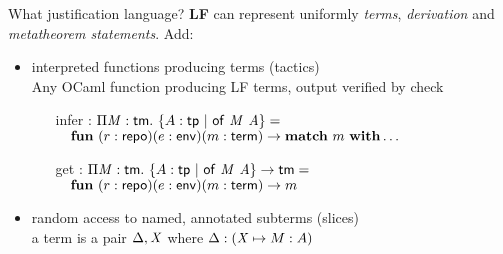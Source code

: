 \documentclass{beamer}
\theoremstyle{example}
\begin{document}
\begin{frame}{What justification language?}
  \textbf{LF} can represent uniformly \emph{terms}, \emph{derivation} and
  \emph{metatheorem statements}. Add:
  \begin{itemize}
  \item interpreted functions producing terms (tactics) \\
    {\footnotesize Any OCaml function producing LF terms,
      output verified by \textsf{check}}
    \begin{example}
      \begin{itemize}
      \item[infer :] $\Pi{\ensuremath{\text{\textit{M}}}}:{\text{\textsf{tm}}}.\ 
        \{ A : \text{\textsf{tp}}\ |\ {\text{\textsf{of}}}\ {\text{\textit{M}}}\ {\text{\textit{A}}} \} =$ \\
        {\small$\quad\mathbf{fun}\ (r : \text{\textsf{repo}}) (e : \text{\textsf{env}}) (m :
          \text{\textsf{term}}) \to \mathbf{match}\ m\ \mathbf{with} \ldots$}
        \\[1em]

      \item[get :] $\Pi{\ensuremath{\text{\textit{M}}}}:{\text{\textsf{tm}}}.\ 
        \{A : \text{\textsf{tp}}\ |\ {\text{\textsf{of}}}\ {\text{\textit{M}}}\ {\text{\textit{A}}}\}
        \to \text{\textsf{tm}}=$ \\
        {\small$\quad\mathbf{fun}\ (r : \text{\textsf{repo}}) (e : \text{\textsf{env}}) (m :
        \text{\textsf{term}}) \to m$}
        \\[1em]

      \item[]
      \end{itemize}
    \end{example}
    \pause
  \item random access to named, annotated subterms (slices) \\
    {\footnotesize a term is a pair $\Delta, \text{\textit{X}}$ where $\Delta :
      (\text{\textit{X}}\mapsto M : A)$}
  \end{itemize}


\end{frame}
\end{document}
